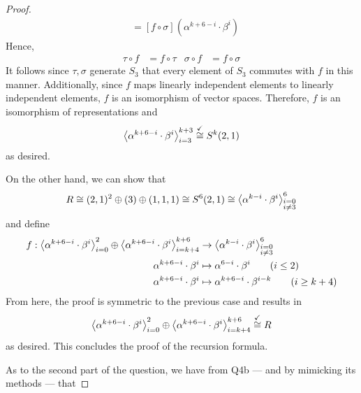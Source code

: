 \documentclass[../psets.tex]{subfiles}
\begin{document}
\begin{enumerate}
\begin{enumerate}
\begin{proof}
\begin{align*}
                &= [f\circ\sigma](\alpha^{k+6-i}\cdot\beta^i)
            \end{align*}
            Hence,
            \begin{align*}
                \tau\circ f &= f\circ\tau&
                \sigma\circ f &= f\circ\sigma
            \end{align*}
            It follows since $\tau,\sigma$ generate $S_3$ that every element of $S_3$ commutes with $f$ in this manner. Additionally, since $f$ maps linearly independent elements to linearly independent elements, $f$ is an isomorphism of vector spaces. Therefore, $f$ is an isomorphism of representations and
            \begin{equation*}
                \left\langle{\alpha^{k+6-i}\cdot\beta^i}\right\rangle_{i=3}^{k+3} \stackrel{\checkmark}{\cong} S^k(2,1)
            \end{equation*}
            as desired.\par
            On the other hand, we can show that
            \begin{equation*}
                R \cong (2,1)^2\oplus(3)\oplus(1,1,1)
                \cong S^6(2,1)
                \cong \left\langle{\alpha^{k-i}\cdot\beta^i}\right\rangle_{\substack{i=0\\i\neq 3}}^6
            \end{equation*}
            and define
            \begin{align*}
                f:\left\langle{\alpha^{k+6-i}\cdot\beta^i}\right\rangle_{i=0}^2\oplus\left\langle{\alpha^{k+6-i}\cdot\beta^i}\right\rangle_{i=k+4}^{k+6} &\to \left\langle{\alpha^{k-i}\cdot\beta^i}\right\rangle_{\substack{i=0\\i\neq 3}}^6\\
                \alpha^{k+6-i}\cdot\beta^i &\mapsto \alpha^{6-i}\cdot\beta^i\tag{$i\leq 2$}\\
                \alpha^{k+6-i}\cdot\beta^i &\mapsto \alpha^{k+6-i}\cdot\beta^{i-k}\tag{$i\geq k+4$}
            \end{align*}
            From here, the proof is symmetric to the previous case and results in
            \begin{equation*}
                \left\langle{\alpha^{k+6-i}\cdot\beta^i}\right\rangle_{i=0}^2\oplus\left\langle{\alpha^{k+6-i}\cdot\beta^i}\right\rangle_{i=k+4}^{k+6} \stackrel{\checkmark}{\cong} R
            \end{equation*}
            as desired. This concludes the proof of the recursion formula.\par
            As to the second part of the question, we have from Q4b --- and by mimicking its methods --- that

\end{proof}
\end{enumerate}
\end{enumerate}
\end{document}
